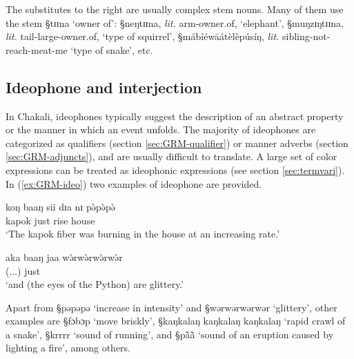 The substitutes to the right are usually complex stem nouns. Many of them use
 the stem {\S tɪɪna} `owner of': {\S neŋtɪɪna}, {\it lit. } arm-owner.of,
`elephant',  {\S muŋzɪŋtɪɪna}, {\it lit. } tail-large-owner.of,  `type of
squirrel', {\S mábíéwāátèlèpúsíŋ},  {\it lit.}
sibling-not-reach-meat-me `type of snake', etc. 



\subsection{Ideophone and interjection}
\label{sec:GRM-onoma}

 In Chakali, ideophones typically suggest the description of an abstract
property
or the manner in which an event unfolds.  The majority of ideophones are
categorized as qualifiers (section \ref{sec:GRM-qualifier}) or manner adverbs
(section \ref{sec:GRM-adjuncts}), and are usually
difficult to translate. A large set of color expressions can be treated as
 ideophonic expressions (see section \ref{sec:termvari}).  In
(\ref{ex:GRM-ideo}) two examples of ideophone are provided.
                                             

\begin{exe}
\ex\label{ex:GRM-ideo}
\begin{xlist}
 \ex\label{ex:GRM-ideo-advm}
\gll koŋ baaŋ sii dɪa nɪ pə̀pə̀pə̀\\
kapok just rise house {\postp} {\advm}\\
  \glt `The kapok fiber was burning in the house at an increasing rate.'

 \ex\label{ex:GRM-ideo-qual}
\gll {} aka baaŋ jaa wə̀rwə̀rwə̀rwə̀r\\
(...) {\conn} just {\ident} {\qual}\\
  \glt `and (the eyes of the Python) are glittery.' 

\end{xlist}
\end{exe}


Apart from {\S pəpəpə} `increase in intensity' and   {\S wərwərwərwər}
`glittery', other
examples are {\S fɔbɔp} `move briskly', {\S kaŋkalaŋ kaŋkalaŋ kaŋkalaŋ} `rapid
crawl of a snake', {\S krrrr} `sound of running', 
 and {\S pã̀ã̀} `sound of an
eruption caused by lighting a fire', among others.

